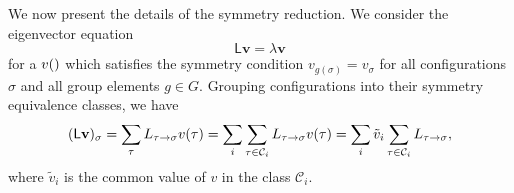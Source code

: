 \documentclass[10pt]{article}
\newcommand{\defeq}{:=}
\newcommand{\vv}{\mathbf{v}}
\renewcommand{\v}[1]{v(#1)}
\newcommand{\equivclass}[1]{\left[ #1 \right]}
\newcommand{\LL}{\mathsf{L}}
\newcommand{\tL}{\tilde{\LL}}
\newcommand{\tv}{\tilde{v}}
\renewcommand{\L}[2]{L_{#2 \to #1}}  %
\newcommand{\size}[1]{\left| #1 \right|}
\newcommand{\class}{\mathcal{C}}
\newcommand{\transp}{^{\text{\small T}}}
\begin{document}
We now present the
details of the symmetry reduction.
% 
% 
% 
We consider the eigenvector equation
\begin{equation} \label{eq:eigenvector}
\LL%
\vv = \lambda \vv
\end{equation}
for a $\v$ which satisfies the symmetry condition $v_{g(\sigma)} =
v_{\sigma}$ for all  configurations $\sigma$ and all group elements $g \in G$.
Grouping
configurations into their symmetry
equivalence classes, we have
\begin{equation} \label{eq:split-equiv-classes}
  (\LL %
\vv)_{\sigma} = \sum_{\tau} \L{\sigma}{\tau} \v{\tau} \\
= \sum_i \sum_{\tau \in \class_i} \L{\sigma}{\tau} \v{\tau} \\
= \sum_i \tv_i \sum_{\tau \in \class_i} \L{\sigma}{\tau},
\end{equation}
where $\tv_i$ is the common value of $v$ in the class $\class_i$.
\end{document}
